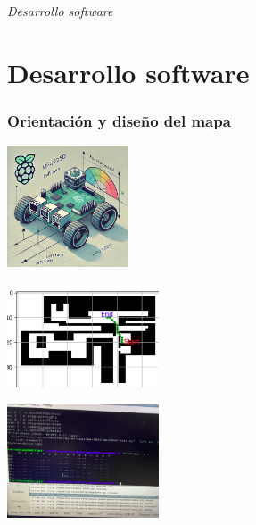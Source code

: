 \documentclass{beamer}
\begin{document}
\section*{}
\begin{frame}{}
  \centering \Huge
  \emph{Desarrollo software}
\end{frame}

\section{Desarrollo software}
\begin{frame}
\frametitle{Orientación y diseño del mapa}
\centering
\begin{minipage}{0.45\textwidth}
    \centering
    \includegraphics[width=3.6cm]{figs/pepe.jpg}
\end{minipage}
\hfill
\begin{minipage}{0.45\textwidth}
    \centering
    \includegraphics[width=4.5cm]{figs/path1.png}
\end{minipage}
\hfill
\vspace{0.3cm} %
\begin{minipage}{0.45\textwidth}
    \centering
    \includegraphics[width=4.5cm]{figs/bus.png}
\end{minipage}

\end{frame}
\end{document}
